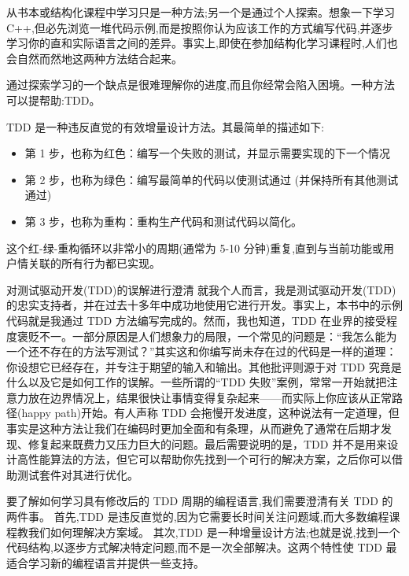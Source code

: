 
从书本或结构化课程中学习只是一种方法;另一个是通过个人探索。想象一下学习 C++,但必先浏览一堆代码示例,而是按照你认为应该工作的方式编写代码,并逐步学习你的直和实际语言之间的差异。事实上,即使在参加结构化学习课程时,人们也会自然而然地这两种方法结合起来。

通过探索学习的一个缺点是很难理解你的进度,而且你经常会陷入困境。一种方法可以提帮助:TDD。

TDD 是一种违反直觉的有效增量设计方法。其最简单的描述如下:

\begin{itemize}
\item 
第 1 步，也称为红色：编写一个失败的测试，并显示需要实现的下一个情况

\item 
第 2 步，也称为绿色：编写最简单的代码以使测试通过 (并保持所有其他测试通过)

\item 
第 3 步，也称为重构：重构生产代码和测试代码以简化。
\end{itemize}

这个红-绿-重构循环以非常小的周期(通常为 5-10 分钟)重复,直到与当前功能或用户情关联的所有行为都已实现。

\begin{myTip}{对测试驱动开发(TDD)的误解进行澄清}
就我个人而言，我是测试驱动开发(TDD)的忠实支持者，并在过去十多年中成功地使用它进行开发。事实上，本书中的示例代码就是我通过 TDD 方法编写完成的。然而，我也知道，TDD 在业界的接受程度褒贬不一。一部分原因是人们想象力的局限，一个常见的问题是：“我怎么能为一个还不存在的方法写测试？”其实这和你编写尚未存在过的代码是一样的道理：你设想它已经存在，并专注于期望的输入和输出。其他批评则源于对 TDD 究竟是什么以及它是如何工作的误解。一些所谓的“TDD 失败”案例，常常一开始就把注意力放在边界情况上，结果很快让事情变得复杂起来——而实际上你应该从正常路径(happy path)开始。有人声称 TDD 会拖慢开发进度，这种说法有一定道理，但事实是这种方法让我们在编码时更加全面和有条理，从而避免了通常在后期才发现、修复起来既费力又压力巨大的问题。最后需要说明的是，TDD 并不是用来设计高性能算法的方法，但它可以帮助你先找到一个可行的解决方案，之后你可以借助测试套件对其进行优化。
\end{myTip}

要了解如何学习具有修改后的 TDD 周期的编程语言,我们需要澄清有关 TDD 的两件事。
首先,TDD 是违反直觉的,因为它需要长时间关注问题域,而大多数编程课程教我们如何理解决方案域。 其次,TDD 是一种增量设计方法;也就是说,找到一个代码结构,以逐步方式解决特定问题,而不是一次全部解决。这两个特性使 TDD 最适合学习新的编程语言并提供一些支持。

